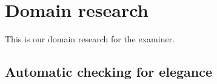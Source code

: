 \part{Domain research}
This is our domain research for the \gls{examiner}.

\chapter{Automatic checking for elegance}


